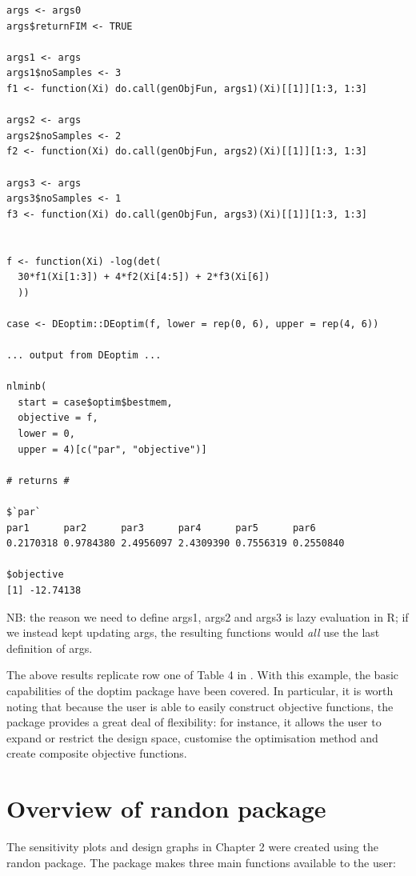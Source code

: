 \documentclass{article}
\theoremstyle{example}
\begin{document}
\begin{verbatim}
args <- args0
args$returnFIM <- TRUE

args1 <- args
args1$noSamples <- 3
f1 <- function(Xi) do.call(genObjFun, args1)(Xi)[[1]][1:3, 1:3]

args2 <- args
args2$noSamples <- 2
f2 <- function(Xi) do.call(genObjFun, args2)(Xi)[[1]][1:3, 1:3]

args3 <- args
args3$noSamples <- 1
f3 <- function(Xi) do.call(genObjFun, args3)(Xi)[[1]][1:3, 1:3]


f <- function(Xi) -log(det(
  30*f1(Xi[1:3]) + 4*f2(Xi[4:5]) + 2*f3(Xi[6])
  ))

case <- DEoptim::DEoptim(f, lower = rep(0, 6), upper = rep(4, 6))

... output from DEoptim ...

nlminb(
  start = case$optim$bestmem, 
  objective = f, 
  lower = 0, 
  upper = 4)[c("par", "objective")]
  
# returns #
  
$`par`
par1      par2      par3      par4      par5      par6 
0.2170318 0.9784380 2.4956097 2.4309390 0.7556319 0.2550840 

$objective
[1] -12.74138
\end{verbatim}

	NB: the reason we need to define \textsf{args1}, \textsf{args2} and \textsf{args3} is lazy evaluation in \textsf{R};
	if we instead kept updating \textsf{args}, the resulting functions would \emph{all} use the last definition of \textsf{args}.

	The above results replicate row one of Table 4 in \cite{Wang2012}.
	With this example, the basic capabilities of the \textsf{doptim} package have been covered.
	In particular, it is worth noting that because the user is able to easily construct objective functions, 
	the package provides a great deal of flexibility: for instance, it allows the user to expand or restrict the design space, customise the optimisation method and create composite objective functions.


\section{Overview of \textsf{randon} package}
	
	The sensitivity plots and design graphs in Chapter 2 were created using the \textsf{randon} package.
	The package makes three main functions available to the user:
\end{document}
